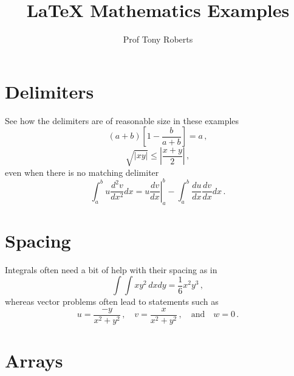 \documentclass[12pt,a4paper]{article}
\begin{document}
\title{\textsf{\LaTeX{} Mathematics Examples}}
\author{Prof Tony Roberts}
\maketitle

\tableofcontents



\section{Delimiters}

See how the delimiters are of reasonable size in these examples
\begin{displaymath}
	\left( a+b \right) \left[ 1-\frac{b}{a+b} \right] = a \,,
\end{displaymath}
\begin{displaymath}
	\sqrt{|xy|} \leq \left| \frac{x+y}{2} \right|\,,
\end{displaymath}
even when there is no matching delimiter
\begin{displaymath}
	\int_a^bu\frac{d^2v}{dx^2}dx 
	= \left. u\frac{dv}{dx} \right|_a^b
	- \int_a^b\frac{du}{dx}\frac{dv}{dx}dx\,.
\end{displaymath}






\section{Spacing}

Integrals often need a bit of help with their spacing as in
\begin{displaymath}
	\int\!\!\!\int xy^2\,dxdy 
	=\frac{1}{6}x^2y^3\,,
\end{displaymath}
whereas vector problems often lead to statements such as
\begin{displaymath}
	u=\frac{-y}{x^2+y^2}\,,\quad
	v=\frac{x}{x^2+y^2}\,,\quad\mbox{and}\quad
	w=0\,.
\end{displaymath}







\section{Arrays}
\end{document}
